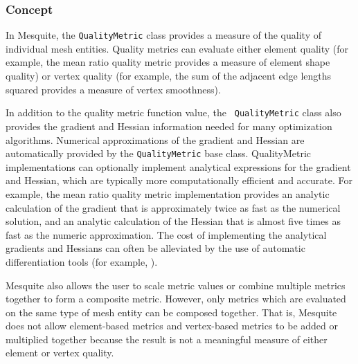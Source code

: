 
\subsubsection{Concept}

In Mesquite, the \texttt{QualityMetric} class provides a measure of
the quality of individual mesh entities.  Quality metrics can evaluate
either element quality (for example, the mean ratio quality
metric provides a measure of element shape quality) or vertex quality
(for example, the sum of the adjacent edge lengths squared provides a
measure of vertex smoothness).  

In addition to the quality metric function value, the {\tt
QualityMetric} class also provides the gradient and Hessian
information needed for many optimization algorithms.  Numerical
approximations of the gradient and Hessian are automatically provided
by the \texttt{QualityMetric} base class.  QualityMetric implementations
can optionally
implement analytical expressions for the gradient and Hessian, which are 
typically more computationally efficient and accurate.  For example, the
mean ratio
quality metric implementation provides an analytic calculation of the gradient 
that is approximately twice as fast as the numerical solution, and an analytic
calculation of the Hessian that is almost five times as fast as the
numeric approximation.  The
cost of implementing the analytical gradients and Hessians can often
be alleviated by the use of automatic differentiation tools
(for example, \cite{bischofadic}).

Mesquite also allows the user to scale metric values or combine
multiple metrics together to form a composite metric.  However, only
metrics which are evaluated on the same type of mesh entity can be
composed together.  That is, Mesquite does not allow element-based
metrics and vertex-based metrics to be added or multiplied together
because the result is not a meaningful measure of either element or
vertex quality.

